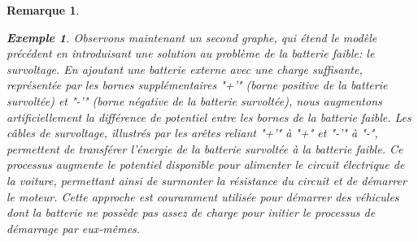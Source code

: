 \documentclass{article}
\theoremstyle{pasdepoint}
\theoremstyle{break}
\newtheorem{example}{Exemple}
\theoremstyle{pasdepoint}
\newtheorem*{remark}{Remarque}
\begin{document}
\begin{remark}
\begin{example}
        \bigskip %
        
        Observons maintenant un second graphe, qui étend le modèle précédent en introduisant une solution au problème de la batterie faible: le survoltage. En ajoutant une batterie externe avec une charge suffisante, représentée par les bornes supplémentaires "+'" (borne positive de la batterie survoltée) et "-'" (borne négative de la batterie survoltée), nous augmentons artificiellement la différence de potentiel entre les bornes de la batterie faible. Les câbles de survoltage, illustrés par les arêtes reliant "+'" à "+" et "-'" à "-", permettent de transférer l'énergie de la batterie survoltée à la batterie faible. Ce processus augmente le potentiel disponible pour alimenter le circuit électrique de la voiture, permettant ainsi de surmonter la résistance du circuit et de démarrer le moteur. Cette approche est couramment utilisée pour démarrer des véhicules dont la batterie ne possède pas assez de charge pour initier le processus de démarrage par eux-mêmes.
        \begin{center}
        \end{center}
    \end{example}

\end{remark}
\end{document}
